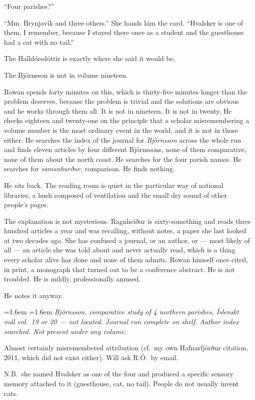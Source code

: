\documentclass[11pt,oneside]{book}
\newcommand{\sceneline}{%
  \par\vspace{1.2em}
  \begin{center}
    \fontsize{11}{11}\selectfont \textbullet\quad\textbullet\quad\textbullet
  \end{center}
  \vspace{0.6em}\noindent\ignorespaces
}
\newenvironment{fieldnote}
  {\par\vspace{0.9em}\begingroup
   \leftskip=1.6em \rightskip=1.6em
   \fontsize{10}{12.4}\selectfont\itshape
   \setlength{\parindent}{0pt}\noindent\ignorespaces}
  {\par\endgroup\vspace{0.9em}\noindent\ignorespaces}
\begin{document}
``Four parishes?''

``Mm. Brynjavík and three others.'' She hands him the card. ``Hvalsker
is one of them, I remember, because I stayed there once as a student and
the guesthouse had a cat with no tail.''

\sceneline

The Halldórsdóttir is exactly where she said it would be.

The Björnsson is not in volume nineteen.

Rowan spends forty minutes on this, which is thirty-five minutes longer
than the problem deserves, because the problem is trivial and the
solutions are obvious and he works through them all. It is not in
nineteen. It is not in twenty. He checks eighteen and twenty-one on the
principle that a scholar misremembering a volume number is the most
ordinary event in the world, and it is not in those either. He searches
the index of the journal for \emph{Björnsson} across the whole run and
finds eleven articles by four different Björnssons, none of them
comparative, none of them about the north coast. He searches for the
four parish names. He searches for \emph{samanburður,} comparison. He
finds nothing.

He sits back. The reading room is quiet in the particular way of
national libraries, a hush composed of ventilation and the small dry
sound of other people's pages.

The explanation is not mysterious. Ragnheiður is sixty-something and
reads three hundred articles a year and was recalling, without notes, a
paper she last looked at two decades ago. She has confused a journal, or
an author, or --- most likely of all --- an article she was told about
and never actually read, which is a thing every scholar alive has done
and none of them admits. Rowan himself once cited, in print, a
monograph that turned out to be a conference abstract. He is not
troubled. He is mildly, professionally amused.

He notes it anyway.

\begin{fieldnote}
Björnsson, comparative study of 4 northern parishes, \emph{Íslenskt mál}
vol.~19 or 20 --- not located. Journal run complete on shelf. Author
index searched. Not present under any volume.

Almost certainly misremembered attribution (cf.\ my own Hafnarfjörður
citation, 2011, which did not exist either). Will ask R.Ó.\ by email.

N.B.\ she named Hvalsker as one of the four and produced a specific
sensory memory attached to it (guesthouse, cat, no tail). People do not
usually invent cats.
\end{fieldnote}
\end{document}
